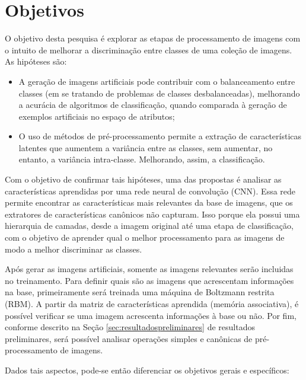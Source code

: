 \section{Objetivos}


O objetivo desta pesquisa é explorar as etapas de processamento de imagens com o intuito de melhorar a discriminação entre classes de uma coleção de imagens. As hipóteses são:


\begin{itemize}
\item A geração de imagens artificiais pode contribuir com o balanceamento entre classes (em se tratando de problemas de classes desbalanceadas), melhorando a acurácia de algoritmos de classificação, quando comparada à geração de exemplos artificiais no espaço de atributos;
\item O uso de métodos de pré-processamento permite a extração de características latentes que aumentem a variância entre as classes, sem aumentar, no entanto, a variância intra-classe. Melhorando, assim, a classificação.
\end{itemize}

Com o objetivo de confirmar tais hipóteses, uma das propostas é analisar as características aprendidas por uma rede neural de convolução (CNN). Essa rede permite encontrar as características mais relevantes da base de imagens, que os extratores de características canônicos não capturam. Isso porque ela possui uma hierarquia de camadas, desde a imagem original até uma etapa de classificação, com o objetivo de aprender qual o melhor processamento para as imagens de modo a melhor discriminar as classes.

Após gerar as imagens artificiais, somente as imagens relevantes serão incluidas no treinamento. Para definir quais são as imagens que acrescentam informações na base, primeiramente será treinada uma máquina de Boltzmann restrita (RBM). A partir da matriz de características aprendida (memória associativa), é possível verificar se uma imagem acrescenta informações à base ou não. Por fim, conforme descrito na Seção \ref{sec:resultadospreliminares} de resultados preliminares, será possível analisar operações simples e canônicas de pré-processamento de imagens.

Dados tais aspectos, pode-se então diferenciar os objetivos gerais e específicos:

